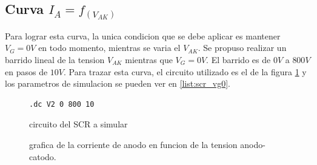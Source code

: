       \subsection{Curva $I_A = f_{(V_{AK})}$}
        Para lograr esta curva, la unica condicion que se debe aplicar es mantener $V_G = 0V$ en todo momento,
        mientras se varia el $V_{AK}$.
          Se propuso realizar un barrido lineal de la tension $V_{AK}$ mientras que $V_G = 0V$. El barrido es de $0V$ a
          $800V$ en pasos de $10V$. Para trazar esta curva, el circuito utilizado es el de la figura \ref{crkt:scr_vg0}
          y los parametros de simulacion se pueden ver en \ref{list:scr_vg0}.
          \begin{figure}[!ht]
            \centering
            \begin{minipage}{0.45\textwidth}
              \centering
              
              \caption{circuito del SCR a simular}
              \label{crkt:scr_vg0}
            \end{minipage}
            \hfill
            \begin{minipage}{0.45\textwidth}
              \centering
            \begin{lstlisting}[style=ltspice, caption={Parámetros de simulación LTspice}, label=list:scr_vg0]
.dc V2 0 800 10
            \end{lstlisting}
            \end{minipage}
          \end{figure}

          \begin{figure}[!ht]
              \caption{grafica de la corriente de anodo en funcion de la tension anodo-catodo.}
              \label{graph:scr_iak_vak_vg0}
          \end{figure}

